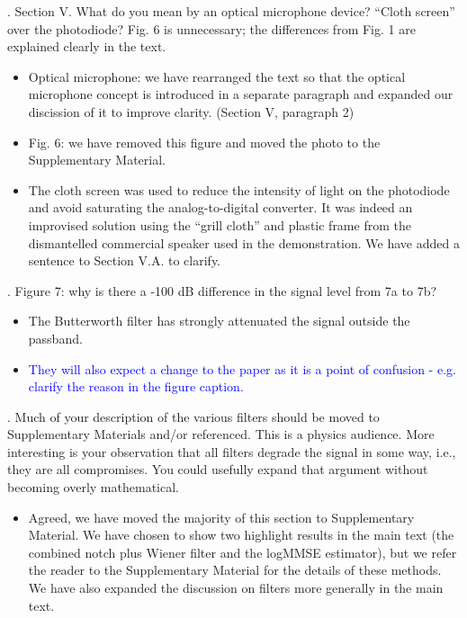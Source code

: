 \documentclass{article}
\newcommand{\todo}{\textcolor{blue}}
\begin{document}
. Section V.  What do you mean by an optical microphone device?  “Cloth screen” over the photodiode?  Fig. 6 is unnecessary; the differences from Fig. 1 are explained clearly in the text.
\begin{itemize}
\item Optical microphone: we have rearranged the text so that the optical microphone concept is introduced in a separate paragraph and expanded our discission of it to improve clarity. (Section V, paragraph 2)
\item Fig. 6: we have removed this figure and moved the photo to the Supplementary Material.
\item The cloth screen was used to reduce the intensity of light on the photodiode and avoid saturating the analog-to-digital converter. It was indeed an improvised solution using the ``grill cloth'' and plastic frame from the dismantelled commercial speaker used in the demonstration. We have added a sentence to Section V.A. to clarify.
\end{itemize}  



. Figure 7: why is there a -100 dB difference in the signal level from 7a to 7b?  
\begin{itemize}
\item The Butterworth filter has strongly attenuated the signal outside the passband.
\item \todo{They will also expect a change to the paper as it is a point of confusion - e.g. clarify the reason in the figure caption.}
\end{itemize}


. Much of your description of the various filters should be moved to Supplementary Materials and/or referenced.  This is a physics audience.  More interesting is your observation that all filters degrade the signal in some way, i.e., they are all compromises.  You could usefully expand that argument without becoming overly mathematical.
\begin{itemize}
\item Agreed, we have moved the majority of this section to Supplementary Material. We have chosen to show two highlight results in the main text (the combined notch plus Wiener filter and the logMMSE estimator), but we refer the reader to the Supplementary Material for the details of these methods. We have also expanded the discussion on filters more generally in the main text. 
\end{itemize}
\end{document}
